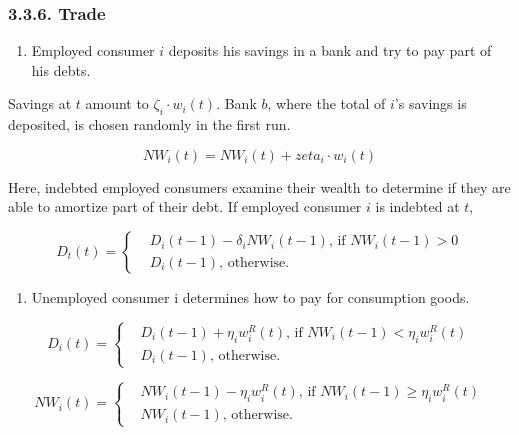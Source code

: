 \documentclass[11pt,]{article}
\providecommand{\tightlist}{%
\setlength{\itemsep}{0pt}\setlength{\parskip}{0pt}}
\begin{document}
\subsubsection{3.3.6. Trade}\label{trade}

\begin{enumerate}
\def\labelenumi{\alph{enumi}.}
\setcounter{enumi}{2}
\tightlist
\item
  Employed consumer \(i\) deposits his savings in a bank and try to pay
  part of his debts.
\end{enumerate}

Savings at \(t\) amount to \(\zeta_i \cdot w_i(t)\). Bank \(b\), where
the total of \(i\)'s savings is deposited, is chosen randomly in the
first run.

\begin{equation}
  NW_i(t) = NW_i(t) + zeta_i \cdot w_i(t)
\end{equation}

Here, indebted employed consumers examine their wealth to determine if
they are able to amortize part of their debt. If employed consumer \(i\)
is indebted at \(t\),

\begin{equation}
  D_t(t) = \begin{cases}
    & D_i(t-1) - \delta_i NW_i(t-1) \text{, if } NW_i(t-1) > 0 \\
    & D_i(t-1) \text{, otherwise.}
  \end{cases}
\end{equation}

\begin{enumerate}
\def\labelenumi{\alph{enumi}.}
\setcounter{enumi}{3}
\tightlist
\item
  Unemployed consumer i determines how to pay for consumption goods.
\end{enumerate}

\begin{equation}
  D_i(t) = \begin{cases}
    & D_i(t-1) + \eta_i w^R_i(t) \text{, if } NW_i(t-1) < \eta_i w^R_i(t) \\
    & D_i(t-1) \text{, otherwise.}
  \end{cases}
\end{equation}

\begin{equation}
  NW_i(t) = \begin{cases}
    & NW_i(t-1) - \eta_i w^R_i(t) \text{, if } NW_i(t-1) \geq \eta_i w^R_i(t) \\
    & NW_i(t-1) \text{, otherwise.}
  \end{cases}
\end{equation}
\end{document}
